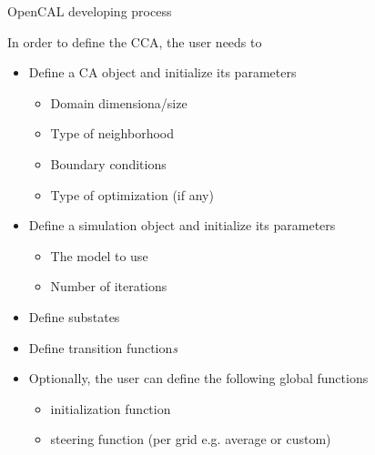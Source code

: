 
\begin{frame}{OpenCAL developing process}

In order to define the CCA, the user needs to

\begin{itemize}
	\item Define a CA object and initialize its parameters
	\begin{itemize}
		\item Domain dimensiona/size
		\item Type of neighborhood
		\item Boundary conditions
		\item Type of optimization (if any)
	\end{itemize}
\pause
	\item Define a simulation object and initialize its parameters
	\begin{itemize}
		\item The model to use
		\item Number of iterations
	\end{itemize}
	\pause
	\item Define substates
	\pause
	\item Define transition function\textit{s}
	\pause
	\item Optionally, the user can define the following global functions
	\begin{itemize}
		\item initialization function
		\item steering function (per grid e.g. average or custom)
	\end{itemize}
\end{itemize}

\end{frame}



